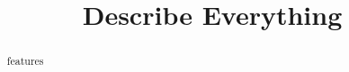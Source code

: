 \documentclass{ximera}
\title{Describe Everything}
\begin{document}
\begin{abstract}
features
\end{abstract}
\maketitle
\end{document}
